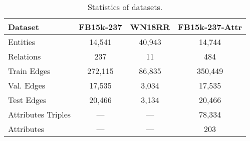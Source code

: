 \documentclass[letterpaper]{article} \usepackage{aaai19}  \usepackage{times}  \usepackage{helvet}  \usepackage{courier}  \usepackage{url}  \usepackage{graphicx}  \usepackage{amsmath}
\begin{document}
\begin{table}[t]
	\caption{Statistics of datasets.}
	\label{tbl:sample}
	\bigskip
	\begin{center}
		\vskip -0.1in
		\setlength{\tabcolsep}{2pt}
		\begin{tabular}{|l|c|c|c|}
\hline
			Dataset & FB15k-237 & WN18RR & FB15k-237-Attr\\
			\hline
Entities	 & 14,541	& 40,943  & 14,744 \\
			Relations	 & 237 & 11 & 484 \\
			Train Edges	 & 272,115 & 86,835 & 350,449 \\
			Val. Edges	 & 17,535 & 3,034 & 17,535 \\
			Test Edges	 & 20,466 & 3,134 & 20,466 \\
			Attributes Triples & --- & --- & 78,334 \\
			Attributes & --- & --- & 203 \\
			\hline
\end{tabular}
	\end{center}
	\vskip -0.25in
\end{table}
\end{document}
